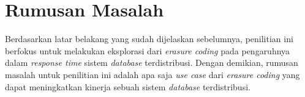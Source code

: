 \section{Rumusan Masalah}

Berdasarkan latar belakang yang sudah dijelaskan sebelumnya, penilitian ini berfokus untuk melakukan eksplorasi dari \textit{erasure coding} pada pengaruhnya dalam \textit{response time} sistem \textit{database} terdistribusi. Dengan demikian, rumusan masalah untuk penilitian ini adalah apa saja \textit{use case} dari \textit{erasure coding} yang dapat meningkatkan kinerja sebuah sistem \textit{database} terdistribusi.

